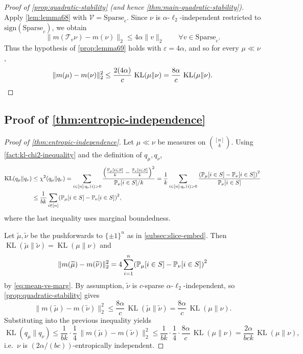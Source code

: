 \documentclass[11pt,reqno,letterpaper]{amsart}
\renewcommand{\P}{\mathbb{P}}
\numberwithin{equation}{section}
\theoremstyle{definition}
\newcommand{\mc}{\mathcal}
\newcommand{\KL}{\operatorname{KL}}
\newcommand{\eps}{\varepsilon}
\let\originalleft\left
\let\originalright\right
\renewcommand{\left}{\mathopen{}\mathclose\bgroup\originalleft}
\renewcommand{\right}{\aftergroup\egroup\originalright}
\begin{document}
\begin{proof}[Proof of \cref{prop:quadratic-stability} (and hence \cref{thm:main-quadratic-stability})]
Apply \cref{lem:lemma68} with $\mathcal{V}=\mathrm{Sparse}_c$. Since $\nu$ is
$\alpha$-$\ell_2$-independent restricted to $\mathrm{sign}(\mathrm{Sparse}_c)$, we obtain
\[
\|m(\mc{T}_v \nu)-m(\nu)\|_2 \le 4\alpha \|v\|_2
\qquad \forall v\in \mathrm{Sparse}_c.
\]
Thus the hypothesis of \cref{prop:lemma69} holds with $\eps=4\alpha$, and so for every $\mu\ll\nu$,
\[
\|m(\mu)-m(\nu)\|_2^2
\le \frac{2(4\alpha)}{c}\,\KL(\mu\|\nu)
= \frac{8\alpha}{c}\,\KL(\mu\|\nu). \qedhere
\]
\end{proof}

\subsection{Proof of \cref{thm:entropic-independence}}

\begin{proof}[Proof of \cref{thm:entropic-independence}]
Let $\mu\ll\nu$ be measures on $\binom{[n]}{k}$.
Using \cref{fact:kl-chi2-inequality} and the definition of $q_\mu,q_\nu$,
\begin{align*}
\KL(q_{\mu}\|q_{\nu})
&\le \chi^2(q_{\mu}\|q_{\nu})
= \sum_{i\in[n]: q_{\nu}(i) > 0}\frac{\left(\frac{\P_\mu[i\in S]}{k}-\frac{\P_\nu[i\in S]}{k}\right)^2}{\P_\nu[i\in S]/k}
= \frac{1}{k}\sum_{i\in[n]: q_{\nu}(i) > 0}\frac{\left(\P_\mu[i\in S]-\P_\nu[i\in S]\right)^2}{\P_\nu[i\in S]} \\
&\le \frac{1}{bk}\sum_{i\in[n]}\left(\P_\mu[i\in S]-\P_\nu[i\in S]\right)^2,
\end{align*}
where the last inequality uses marginal boundedness.

Let $\widetilde{\mu},\widetilde{\nu}$ be the pushforwards to $\{\pm1\}^n$ as in \cref{subsec:slice-embed}.
Then $\KL(\widetilde{\mu}\|\widetilde{\nu})=\KL(\mu\|\nu)$ and
\[
\|m(\widetilde{\mu})-m(\widetilde{\nu})\|_2^2
=
4\sum_{i=1}^n\left(\P_\mu[i\in S]-\P_\nu[i\in S]\right)^2
\]
by \cref{eq:mean-vs-marg}. By assumption, $\widetilde{\nu}$ is $c$-sparse $\alpha$-$\ell_2$-independent, so
\cref{prop:quadratic-stability} gives
\[
\|m(\widetilde{\mu})-m(\widetilde{\nu})\|_2^2 \le \frac{8\alpha}{c}\,\KL(\widetilde{\mu}\|\widetilde{\nu})
= \frac{8\alpha}{c}\,\KL(\mu\|\nu).
\]
Substituting into the previous inequality yields
\[
\KL(q_{\mu}\|q_{\nu})
\le \frac{1}{bk}\cdot \frac{1}{4}\,\|m(\widetilde{\mu})-m(\widetilde{\nu})\|_2^2
\le \frac{1}{bk}\cdot \frac{1}{4}\cdot \frac{8\alpha}{c}\,\KL(\mu\|\nu)
= \frac{2\alpha}{bck}\,\KL(\mu\|\nu),
\]
i.e.\ $\nu$ is $(2\alpha/(bc))$-entropically independent.
\end{proof}
\end{document}
